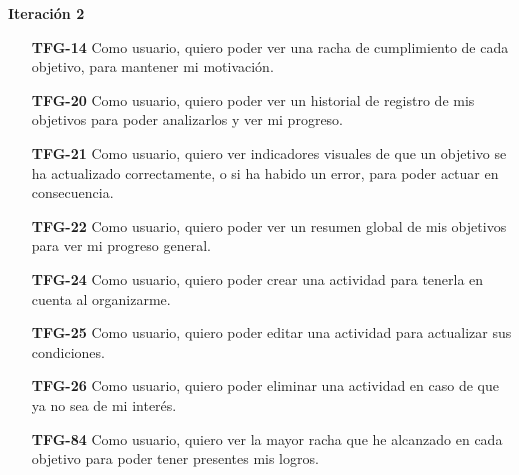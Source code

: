 \documentclass[10pt, a4paper]{aqademic}
\begin{document}
\textbf{Iteración 2}
\begin{itemize}[leftmargin=16mm]
	\item [\textbf{TFG-14}] Como usuario, quiero poder ver una racha de cumplimiento de cada objetivo, para mantener mi motivación.

	\item [\textbf{TFG-20}] Como usuario, quiero poder ver un historial de registro de mis objetivos para poder analizarlos y ver mi progreso.
	
	\item [\textbf{TFG-21}] Como usuario, quiero ver indicadores visuales de que un objetivo se ha actualizado correctamente, o si ha habido un error, para poder actuar en consecuencia.
	
	\item [\textbf{TFG-22}] Como usuario, quiero poder ver un resumen global de mis objetivos para ver mi progreso general.
	
	\item [\textbf{TFG-24}] Como usuario, quiero poder crear una actividad para tenerla en cuenta al organizarme.
	
	\item [\textbf{TFG-25}] Como usuario, quiero poder editar una actividad para actualizar sus condiciones.
	
	\item [\textbf{TFG-26}] Como usuario, quiero poder eliminar una actividad en caso de que ya no sea de mi interés.
	
	\item [\textbf{TFG-84}] Como usuario, quiero ver la mayor racha que he alcanzado en cada objetivo para poder tener presentes mis logros.
\end{itemize}
\end{document}
